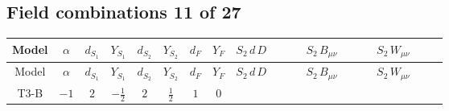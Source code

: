 \documentclass[8pt]{article}
\begin{document}
\begin{landscape}
\subsection*{Field combinations 11 of 27}
\begin{longtable}{@{}cccccccc >{\raggedright\arraybackslash}p{0.21\linewidth} >{\raggedright\arraybackslash}p{0.21\linewidth} >{\raggedright\arraybackslash}p{0.21\linewidth}@{}}
\toprule
Model & $\alpha$ & $d_{S_1}$ & $Y_{S_1}$ & $d_{S_2}$ & $Y_{S_2}$ & $d_F$ & $Y_F$ & $S_2\,d\,D$ & $S_2\,B_{\mu\nu}$ & $S_2\,W_{\mu\nu}$ \\
\midrule
\endfirsthead
\toprule
Model & $\alpha$ & $d_{S_1}$ & $Y_{S_1}$ & $d_{S_2}$ & $Y_{S_2}$ & $d_F$ & $Y_F$ & $S_2\,d\,D$ & $S_2\,B_{\mu\nu}$ & $S_2\,W_{\mu\nu}$ \\
\midrule
\endhead
T3-B & $-1$ & $2$ & $-\frac{1}{2}$ & $2$ & $\frac{1}{2}$ & $1$ & $0$ & \scriptsize\adjustbox{max width=\linewidth}{$\begin{gathered} -\frac{i \hbar  \overline{d_{\alpha _1,i_2}}\, \gamma ^{\mu _1}\, P_R\, d_{\alpha _1,i_2} g_1^4 S_{2,j_1} D_{\mu _1}\left(S_{2,j_1}\right){}^{\dagger }}{360 m_1^2} \\ +\frac{i \hbar  \overline{d_{\alpha _1,i_2}}\, \gamma ^{\mu _1}\, P_R\, d_{\alpha _1,i_2} g_1^4 S_{2,j_1}{}^{\dagger } D_{\mu _1}\left(S_{2,j_1}\right)}{360 m_1^2}\end{gathered}$} & \scriptsize\adjustbox{max width=\linewidth}{$\begin{gathered} -\frac{\hbar  B_{\mu _1\mu _2}^2 S_{2,j_1} S_{2,j_1}{}^{\dagger } \lambda_{12}^{(1)}^{(1)}}{48 m_1^2} \\ -\frac{\hbar  B_{\mu _1\mu _2}^2 S_{2,j_1} S_{2,j_1}{}^{\dagger } \lambda_{12}^{(1)}^{(2)}}{16 \sqrt{3} m_1^2}\end{gathered}$} & \scriptsize\adjustbox{max width=\linewidth}{$\begin{gathered} -\frac{\hbar  \text{cg2}_{j_1,j_2,A_1,A_2} S_{2,j_2} W_{\mu _1\mu _2}^{A_1} W_{\mu _1\mu _2}^{A_2} S_{2,j_1}{}^{\dagger } \lambda_{12}^{(1)}^{(1)}}{12 m_1^2} \\ -\frac{\hbar  S_{2,j_1} \left(W_{\mu _1\mu _2}^{A_1}\right){}^2 S_{2,j_1}{}^{\dagger } \lambda_{12}^{(1)}^{(2)}}{24 \sqrt{3} m_1^2} \\ -\frac{\hbar  \text{cg2}_{j_1,j_2,A_1,A_2} S_{2,j_2} W_{\mu _1\mu _2}^{A_1} W_{\mu _1\mu _2}^{A_2} S_{2,j_1}{}^{\dagger } \lambda_{12}^{(1)}^{(2)}}{12 \sqrt{3} m_1^2}\end{gathered}$} \\
\midrule
\bottomrule
\end{longtable}
\clearpage

\end{landscape}
\end{document}
